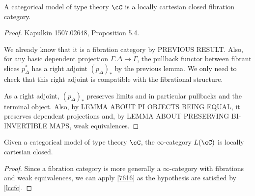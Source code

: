 \begin{prop}\label{lccfc}
  A categorical model of type theory $\cC$ is a locally cartesian closed
  fibration category.
\end{prop}
\begin{proof}
  Kapulkin 1507.02648, Proposition 5.4.

  We already know that it is a
  fibration category by PREVIOUS RESULT. Also, for any basic dependent projection
  $\Gamma.\Delta\rightarrow\Gamma$, the pullback functor between fibrant slices
  $p^*_\Delta$ has a right adjoint $(p_\Delta)_*$ by the previous lemma.
  We only need to check that this right adjoint is
  compatible with the fibrational structure.

  As a right adjoint, $(p_\Delta)_*$ preserves limits and in particular pullbacks and
  the terminal object. Also, by LEMMA ABOUT PI OBJECTS BEING EQUAL, it preserves
  dependent projections and, by LEMMA ABOUT PRESERVING BI-INVERTIBLE MAPS, weak
  equivalences.
\end{proof}

\begin{thm}
  Given a categorical model of type theory $\cC$, the $\infty$-category $L(\cC)$
  is locally cartesian closed.
\end{thm}
\begin{proof}
  Since a fibration category is more generally a $\infty$-category with
  fibrations and weak equivalences, we can apply \ref{7616} as the hypothesis
  are satisfied by \ref{lccfc}.
\end{proof}


